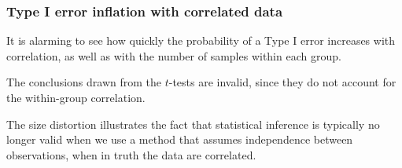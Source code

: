 \documentclass{beamer}
\begin{document}
\begin{frame}
\frametitle{Type I error inflation with correlated data}
\bi
\item It is alarming to see how quickly the probability of a Type I error increases with correlation, as well as with the number of samples within each group. 
\item The conclusions drawn from the $t$-tests are invalid, since they do not account for the within-group correlation.
\item The size distortion illustrates the fact that \alert{statistical inference is typically no longer valid}
when we use a method that assumes independence between observations, when in truth the data are correlated.
\ei
\end{frame}
\end{document}
